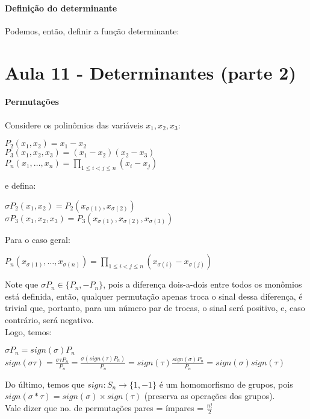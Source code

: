 \documentclass[12pt]{article}
\begin{document}
\paragraph{Definição do determinante\\}
	Podemos, então, definir a função determinante:\\[10pt]
	\centerline{}
	
\newpage
\section*{Aula 11 - Determinantes (parte 2)}
\paragraph{Permutações\\}
	Considere os polinômios das variáveis $x_1, x_2, x_3$:
	\begin{center}
	$P_2(x_1,x_2) = x_1 - x_2$ \\[5pt] 
	$P_3(x_1,x_2,x_3) = (x_1 - x_2)(x_2 - x_3)$ \\[5pt]
	$P_n(x_1, \dots, x_n) = \prod\limits_{1 \leq i < j \leq n} (x_i - x_j)$
	\end{center}
	e defina:
	\begin{center}
	$\sigma P_2(x_1, x_2) = P_2(x_{\sigma(1)}, x_{\sigma(2)})$\\
	$\sigma P_3(x_1, x_2, x_3) = P_3(x_{\sigma(1)}, x_{\sigma(2)}, x_{\sigma(3)})$
	\end{center}
	Para o caso geral:\begin{center}$P_n(x_{\sigma(1)}, \dots, x_{\sigma(n)}) = \prod\limits_{1 \leq i < j \leq n} (x_{\sigma(i)} - x_{\sigma(j)})$\end{center}
	Note que $\sigma P_n \in \lbrace P_n, -P_n \rbrace$, pois a diferença dois-a-dois entre todos os monômios está definida, então, qualquer permutação apenas troca o sinal dessa diferença, é trivial que, portanto, para um número par de trocas, o sinal será positivo, e, caso contrário, será negativo.\\
	Logo, temos:
	\begin{center}
	$\sigma P_n = sign(\sigma) P_n$ \\[5pt]
	$sign(\sigma \tau) = \frac{\sigma \tau P_n}{P_n} = \frac{\sigma (sign(\tau)P_n)}{P_n} = sign(\tau)\frac{sign(\sigma) P_n}{P_n}= sign(\sigma) sign( \tau )$
	\end{center}
	Do último, temos que $sign: S_n \rightarrow \lbrace 1, -1 \rbrace$ é um homomorfismo de grupos, pois $sign(\sigma * \tau) = sign(\sigma) \times sign(\tau)$ (preserva as operações dos grupos).\\
	Vale dizer que no. de permutações pares = ímpares = $\frac{n!}{2}$
\end{document}
